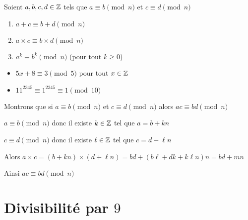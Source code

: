 \begin{frame}

\begin{proposition}
Soient $a,b,c,d \in \mathbb{Z}$ tels que  $a \equiv b \pmod n$ et $c \equiv d \pmod n$
\pause
\begin{enumerate}
  \item  $a+c \equiv b+d \pmod n$
\pause
  \item $a\times c \equiv b \times d \pmod n$
\pause
  \item $a^k \equiv b^k \pmod n$ (pour tout $k\ge 0$)
\end{enumerate}
\end{proposition}

\pause

\begin{exemple}
\begin{itemize}
  \item $5x+8 \equiv 3 \pmod 5$ \quad pour tout $x \in \mathbb{Z}$
\pause
  \item $11^{2345} \equiv 1^{2345} \equiv 1 \pmod {10}$
\end{itemize}
\end{exemple}

\pause

{\footnotesize
Montrons que si $a \equiv b \pmod n$ et $c \equiv d \pmod n$ alors $ac \equiv bd \pmod n$

\pause

\quad $a \equiv b \pmod n$ donc il existe $k \in \mathbb{Z}$ tel que $a=b + kn$ 

\pause

\quad $c \equiv d \pmod n$ donc il existe $\ell \in \mathbb{Z}$ tel que $c = d + \ell n$

\pause

\quad Alors $a\times c = (b+kn)\times(d+\ell n) = bd + (b \ell + d k + k\ell n)n = bd + mn$ 

\pause

\quad Ainsi $ac \equiv bd \pmod n$
}

\end{frame}

\section{Divisibilité par $9$}

